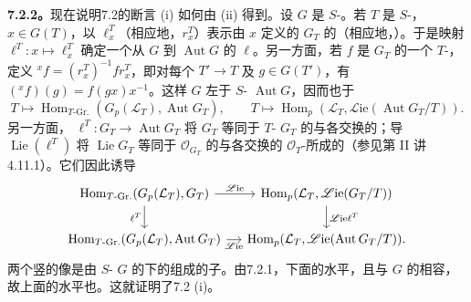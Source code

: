 \textbf{7.2.2。}现在说明7.2的断言 (i) 如何由 (ii) 得到。设 $G$ 是 $S$-。若 $T$ 是 $S$-，$x\in G(T)$，以 $\ell_x^T$（相应地，$r_x^T$）表示由 $x$ 定义的 $G_T$ 的（相应地，）。于是映射 $\ell^T:x\mapsto\ell_x^T$ 确定一个从 $G$ 到 $\operatorname{Aut}G$ 的 $\ell$。另一方面，若 $f$ 是 $G_T$ 的一个 $T$-，定义 ${}^xf=(r_x^T)^{-1}fr_x^T$，即对每个 $T'\to T$ 及 $g\in G(T')$，有 $({}^xf)(g)=f(gx)x^{-1}$。这样 $G$ 左于 $S$- $\operatorname{Aut}G$，因而也于
\[
 T\longmapsto\operatorname{Hom}_{T\text{-Gr.}}(G_p(\mathcal L_T),\operatorname{Aut}G_T),\qquad
 T\longmapsto\operatorname{Hom}_p(\mathcal L_T,\mathscr{L}\mathrm{ie}(\operatorname{Aut}G_T/T)).
\]
另一方面， $\ell^T:G_T\to\operatorname{Aut}G_T$ 将 $G_T$ 等同于 $T$- $G_T$ 的与各交换的；导 $\operatorname{Lie}(\ell^T)$ 将 $\operatorname{Lie}G_T$ 等同于 $\mathcal O_{G_T}$ 的与各交换的 $\mathcal O_T$-所成的（参见第 II 讲4.11.1）。它们因此诱导
\[
\begin{tikzcd}[column sep=small]
 \operatorname{Hom}_{T\text{-Gr.}}(G_p(\mathcal L_T),G_T)
 \arrow[r,"\mathscr{L}\mathrm{ie}"]\arrow[d,"\ell^T"']
 &\operatorname{Hom}_p(\mathcal L_T,\mathscr{L}\mathrm{ie}(G_T/T))\arrow[d,"\mathscr{L}\mathrm{ie}\ell^T"]\\
 \operatorname{Hom}_{T\text{-Gr.}}(G_p(\mathcal L_T),\operatorname{Aut}G_T)
 \arrow[r,"\mathscr{L}\mathrm{ie}"']
 &\operatorname{Hom}_p(\mathcal L_T,\mathscr{L}\mathrm{ie}(\operatorname{Aut}G_T/T)).
\end{tikzcd}
\]
两个竖的像是由 $S$- $G$ 的下的组成的子。由7.2.1，下面的水平，且与 $G$ 的相容，故上面的水平也。这就证明了7.2 (i)。

